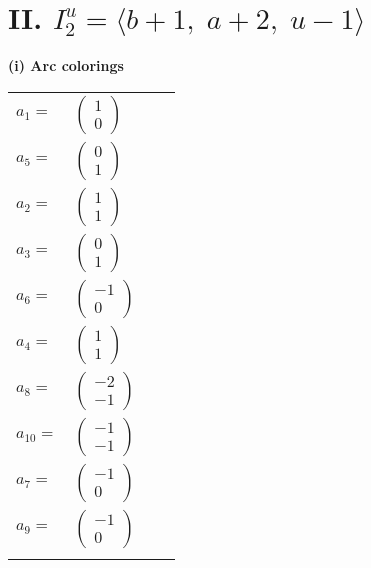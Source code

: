 \documentclass[1p]{elsarticle_modified}
\theoremstyle{definition}
\begin{document}
\centering \section*{II. $I^u_{2}= \langle b+1,\;a+2,\;u-1 \rangle$}
\flushleft \textbf{(i) Arc colorings}\\
\begin{tabular}{m{7pt} m{180pt} m{7pt} m{180pt} }
\flushright $a_{1}=$&$\begin{pmatrix}1\\0\end{pmatrix}$ \\
\flushright $a_{5}=$&$\begin{pmatrix}0\\1\end{pmatrix}$ \\
\flushright $a_{2}=$&$\begin{pmatrix}1\\1\end{pmatrix}$ \\
\flushright $a_{3}=$&$\begin{pmatrix}0\\1\end{pmatrix}$ \\
\flushright $a_{6}=$&$\begin{pmatrix}-1\\0\end{pmatrix}$ \\
\flushright $a_{4}=$&$\begin{pmatrix}1\\1\end{pmatrix}$ \\
\flushright $a_{8}=$&$\begin{pmatrix}-2\\-1\end{pmatrix}$ \\
\flushright $a_{10}=$&$\begin{pmatrix}-1\\-1\end{pmatrix}$ \\
\flushright $a_{7}=$&$\begin{pmatrix}-1\\0\end{pmatrix}$ \\
\flushright $a_{9}=$&$\begin{pmatrix}-1\\0\end{pmatrix}$\\&\end{tabular}
\end{document}
